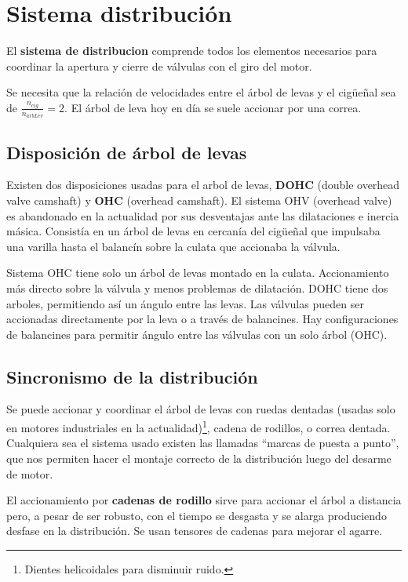 \section{Sistema distribución}
El \textbf{sistema de distribucion} comprende todos los elementos necesarios para coordinar la apertura y cierre de válvulas con el giro del motor.

Se necesita que la relación de velocidades entre el árbol de levas y el cigüeñal sea de $\frac{n_{cig}}{n_{arbLev}}=2$. El árbol de leva hoy en día se suele accionar por una correa. 

\subsection{Disposición de árbol de levas}
Existen dos disposiciones usadas para el arbol de levas, \textbf{DOHC} (double overhead valve camshaft) y \textbf{OHC} (overhead camshaft). El sistema OHV (overhead valve) es abandonado en la actualidad por sus desventajas ante las dilataciones e inercia másica. Consistía en un árbol de levas en cercanía del cigüeñal que impulsaba una varilla hasta el balancín sobre la culata que accionaba la válvula.

Sistema OHC tiene solo un árbol de levas montado en la culata. Accionamiento más directo sobre la válvula y menos problemas de dilatación. DOHC tiene dos arboles, permitiendo así un ángulo entre las levas. Las válvulas pueden ser accionadas directamente por la leva o a través de balancines. Hay configuraciones de balancines para permitir ángulo entre las válvulas con un solo árbol (OHC).

\subsection{Sincronismo de la distribución}
Se puede accionar y coordinar el árbol de levas con ruedas dentadas (usadas solo en motores industriales en la actualidad)\footnote{Dientes helicoidales para disminuir ruido.}, cadena de rodillos, o correa dentada. Cualquiera sea el sistema usado existen las
llamadas “marcas de puesta a punto”, que nos permiten hacer el montaje correcto de la distribución luego del desarme de motor.

El accionamiento por \textbf{cadenas de rodillo} sirve para accionar el árbol a distancia pero, a pesar de ser robusto, con el tiempo se desgasta y se alarga produciendo desfase en la distribución. Se usan tensores de cadenas para mejorar el agarre.

